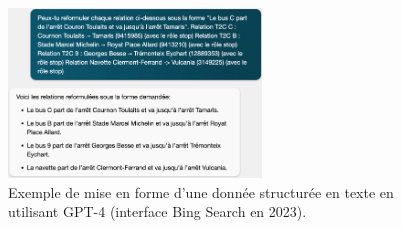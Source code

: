 \begin{figure}[ht]
    \centering
    \includegraphics[width=0.6\textwidth]{images/conclusion/test_gpt.png}
    \caption[Mise en forme textuelle avec GPT-4]{Exemple de mise en forme d'une donnée structurée en texte en utilisant GPT-4 (interface Bing Search en 2023).}
    \label{fig:conclusion_testgpt}
\end{figure}